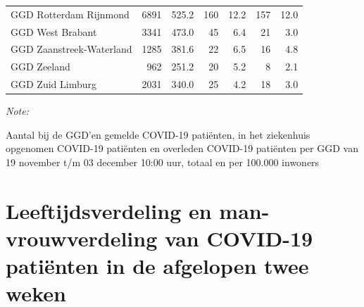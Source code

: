 \documentclass[
  english,
  man,floatsintext]{apa6}
\begin{document}
\begin{table}[H]
\begin{threeparttable}
\begin{tabular}{lrrrrrr}
GGD Rotterdam Rijnmond & 6891 & 525.2 & 160 & 12.2 & 157 & 12.0\\
GGD West Brabant & 3341 & 473.0 & 45 & 6.4 & 21 & 3.0\\
GGD Zaanstreek-Waterland & 1285 & 381.6 & 22 & 6.5 & 16 & 4.8\\
GGD Zeeland & 962 & 251.2 & 20 & 5.2 & 8 & 2.1\\
GGD Zuid Limburg & 2031 & 340.0 & 25 & 4.2 & 18 & 3.0\\
\bottomrule
\end{tabular}
\begin{tablenotes}
\item \textit{Note: } 
\item Aantal bij de GGD’en gemelde COVID-19 patiënten, in het ziekenhuis opgenomen COVID-19 patiënten en overleden COVID-19 patiënten per GGD van 19 november t/m 03 december 10:00 uur, totaal en per 100.000 inwoners
\end{tablenotes}
\end{threeparttable}
\endgroup{}
\end{table}

\newpage

\hypertarget{leeftijdsverdeling-en-man-vrouwverdeling-van-covid-19-patiuxebnten-in-de-afgelopen-twee-weken}{%
\section{Leeftijdsverdeling en man-vrouwverdeling van COVID-19 patiënten in de afgelopen twee weken}\label{leeftijdsverdeling-en-man-vrouwverdeling-van-covid-19-patiuxebnten-in-de-afgelopen-twee-weken}}
\end{document}
